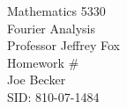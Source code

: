\begin{titlepage}
\setlength{\topmargin}{1.5in}
\begin{center}
\Huge{Mathematics 5330} \\
\LARGE{Fourier Analysis} \\
\Large{Professor Jeffrey Fox} \\[1cm]

\huge{Homework \#\HWnum}\\[0.5cm]

\large{Joe Becker} \\
\large{SID: 810-07-1484} \\
\large{\due} 

\end{center}

\end{titlepage}

